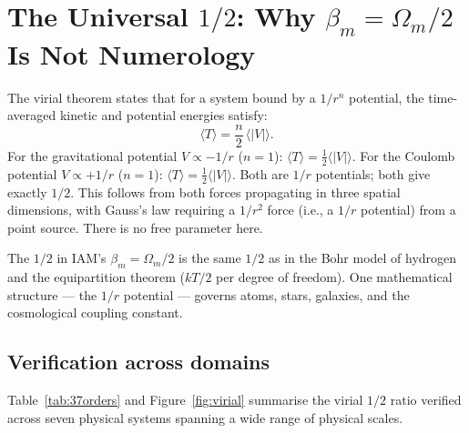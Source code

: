 \documentclass[12pt,a4paper]{article}
\begin{document}
\section{The Universal $1/2$: Why $\beta_m = \Omega_m/2$ Is Not Numerology}
\label{sec:virial}

The virial theorem \citep{Clausius1870} states that for a system bound by a $1/r^n$
potential, the time-averaged kinetic and potential energies satisfy:
\begin{equation}
  \langle T \rangle = \frac{n}{2}\,\langle |V| \rangle.
  \label{eq:virial}
\end{equation}
For the gravitational potential $V \propto -1/r$ ($n=1$): $\langle T \rangle = \frac{1}{2}\langle |V| \rangle$.
For the Coulomb potential $V \propto +1/r$ ($n=1$): $\langle T \rangle = \frac{1}{2}\langle |V| \rangle$.
Both are $1/r$ potentials; both give exactly $1/2$. This follows from both forces
propagating in three spatial dimensions, with Gauss's law requiring a $1/r^2$ force
(i.e., a $1/r$ potential) from a point source. There is no free parameter here.

The $1/2$ in IAM's $\beta_m = \Omega_m/2$ is the same $1/2$ as in the Bohr model of
hydrogen and the equipartition theorem ($kT/2$ per degree of freedom). One
mathematical structure --- the $1/r$ potential --- governs atoms, stars, galaxies, and
the cosmological coupling constant.

\subsection{Verification across domains}

Table~\ref{tab:37orders} and Figure~\ref{fig:virial} summarise the virial $1/2$ ratio
verified across seven physical systems spanning a wide range of physical scales.
\end{document}
